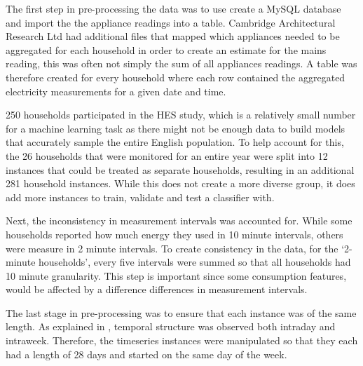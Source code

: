 The first step in pre-processing the data was to use create a MySQL database and import the the appliance readings into a table. Cambridge Architectural Research Ltd had additional files that mapped which appliances needed to be aggregated for each household in order to create an estimate for the mains reading, this was often not simply the sum of all appliances readings. A table was therefore created for every household where each row contained the aggregated electricity measurements for a given date and time. 

250 households participated in the HES study, which is a relatively small number for a machine learning task as there might not be enough data to build models that accurately sample the entire English population. To help account for this, the 26 households that were monitored for an entire year were split into 12 instances that could be treated as separate households, resulting in an additional 281 household instances. While this does not create a more diverse group, it does add more instances to train, validate and test a classifier with.

Next, the inconsistency in measurement intervals was accounted for. While some households reported how much energy they used in 10 minute intervals, others were measure in 2 minute intervals. To create consistency in the data, for the `2-minute households', every five intervals were summed so that all households had 10 minute granularity. This step is important since some consumption features, would be affected by a difference differences in measurement intervals.

The last stage in pre-processing was to ensure that each instance was of the same length. As explained in \fourierSection, temporal structure was observed both intraday and intraweek. Therefore, the timeseries instances were manipulated so that they each had a length of 28 days and started on the same day of the week.





